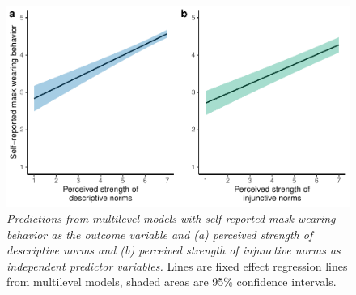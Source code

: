 \documentclass[
  man,floatsintext]{apa6}
\begin{document}
\begin{figure}
\centering
\includegraphics{manuscript_files/figure-latex/plotCorBehNorm-1.pdf}
\caption{\label{fig:plotCorBehNorm}\emph{Predictions from multilevel models with self-reported mask wearing behavior as the outcome variable and (a) perceived strength of descriptive norms and (b) perceived strength of injunctive norms as independent predictor variables.} Lines are fixed effect regression lines from multilevel models, shaded areas are 95\% confidence intervals.}
\end{figure}

\newpage
\end{document}
